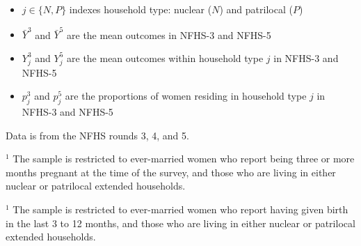 \documentclass[12pt]{article}
\begin{document}
\begin{itemize}
    \item $j \in \{N,P\}$ indexes household type: nuclear ($N$) and patrilocal ($P$)
    \item $\bar Y^{3}$ and $\bar Y^{5}$ are the mean outcomes in NFHS-3 and NFHS-5
    \item $Y_j^{3}$ and $Y_j^{5}$ are the mean outcomes within household type $j$ in NFHS-3 and NFHS-5
    \item $p_j^{3}$ and $p_j^{5}$ are the proportions of women residing in household type $j$ in NFHS-3 and NFHS-5
\end{itemize}




\begin{table}[H]
    \centering
    \begin{threeparttable}[t]
        \caption{:  None of the improvement in the outcomes is explained by changing composition in household structures}
        \label{tab:decomposition}

        \scriptsize
        \setlength{\tabcolsep}{10pt}
        \renewcommand{\arraystretch}{2.5}

        

        \begin{tablenotes}
            \item Data is from the NFHS rounds 3, 4, and 5. 
            \item $^1$ The sample is restricted to ever-married women who report being three or more months pregnant at the time of the survey, and those who are living in either nuclear or patrilocal extended households. 

            \item $^1$ The sample is restricted to ever-married women who report having given birth in the last 3 to 12 months, and those who are living in either nuclear or patrilocal extended households. 

            
        \end{tablenotes}
    \end{threeparttable}
\end{table}



\end{document}
